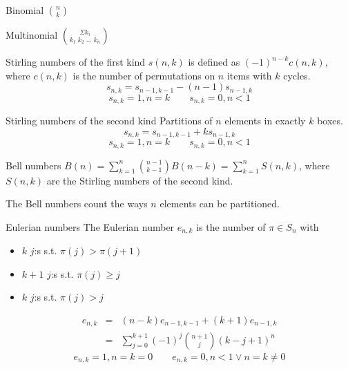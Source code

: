 

\begin{algorithm}{Binomial $\binom{n}{k}$}
\end{algorithm}

\begin{algorithm}{Multinomial $\binom{\Sigma k_i}{k_1\;k_2\;\ldots\;k_n}$}
\end{algorithm}

\begin{algorithm}{Stirling numbers of the first kind}
\desc
$s(n,k)$ is defined as
$(-1)^{n-k}c(n,k)$, where $c(n,k)$ is the number of permutations on
$n$ items with $k$ cycles.
$$s_{n,k} = s_{n-1,k-1} - (n-1)s_{n-1,k}$$
$$s_{n,k} = 1, n = k \qquad s_{n,k} = 0, n < 1$$
\end{algorithm}

\begin{algorithm}{Stirling numbers of the second kind}
\desc
Partitions of $n$ elements in exactly $k$ boxes.
$$s_{n,k} = s_{n-1,k-1} + ks_{n-1,k}$$
$$s_{n,k} = 1, n = k \qquad s_{n,k} = 0, n < 1$$
\end{algorithm}

\begin{algorithm}{Bell numbers}
\desc
$B(n) = \sum_{k=1}^n \binom{n-1}{k-1} B(n-k) = \sum_{k=1}^n S(n,k)$,
where $S(n, k)$ are the Stirling numbers of the second kind.

The Bell numbers count the ways $n$ elements can be partitioned.
\end{algorithm}

\begin{algorithm}{Eulerian numbers}
\desc
The Eulerian number $e_{n,k}$ is the number of $\pi \in S_n$ with
\begin{itemize}
\item $k$ $j$:s s.t. $\pi(j) > \pi(j+1)$
\item $k+1$ $j$:s s.t. $\pi(j) \ge j$
\item $k$ $j$:s s.t. $\pi(j) > j$
\end{itemize}
\begin{eqnarray*}
e_{n,k} & = & (n-k)e_{n-1,k-1} + (k+1) e_{n-1, k}\\
        & = & \sum_{j=0}^{k+1}(-1)^j \binom{n+1}{j} (k - j + 1)^n
\end{eqnarray*}
$$e_{n,k} = 1, n = k = 0 \qquad e_{n,k} = 0, n < 1 \vee n = k \ne 0$$
\end{algorithm}


